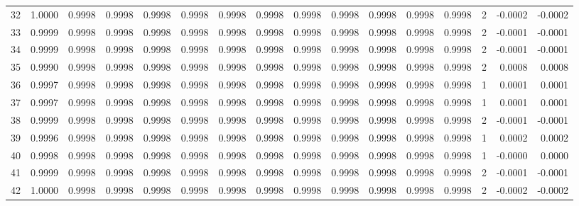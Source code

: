 \begin{tabular}{lrrrrrrrrrrrrrrr}
32  &      1.0000 &  0.9998 &  0.9998 &  0.9998 &  0.9998 &  0.9998 &  0.9998 &  0.9998 &  0.9998 &  0.9998 &   0.9998 &     0.9998 &      2 &                   -0.0002 &                    -0.0002 \\
33  &      0.9999 &  0.9998 &  0.9998 &  0.9998 &  0.9998 &  0.9998 &  0.9998 &  0.9998 &  0.9998 &  0.9998 &   0.9998 &     0.9998 &      2 &                   -0.0001 &                    -0.0001 \\
34  &      0.9999 &  0.9998 &  0.9998 &  0.9998 &  0.9998 &  0.9998 &  0.9998 &  0.9998 &  0.9998 &  0.9998 &   0.9998 &     0.9998 &      2 &                   -0.0001 &                    -0.0001 \\
35  &      0.9990 &  0.9998 &  0.9998 &  0.9998 &  0.9998 &  0.9998 &  0.9998 &  0.9998 &  0.9998 &  0.9998 &   0.9998 &     0.9998 &      2 &                    0.0008 &                     0.0008 \\
36  &      0.9997 &  0.9998 &  0.9998 &  0.9998 &  0.9998 &  0.9998 &  0.9998 &  0.9998 &  0.9998 &  0.9998 &   0.9998 &     0.9998 &      1 &                    0.0001 &                     0.0001 \\
37  &      0.9997 &  0.9998 &  0.9998 &  0.9998 &  0.9998 &  0.9998 &  0.9998 &  0.9998 &  0.9998 &  0.9998 &   0.9998 &     0.9998 &      1 &                    0.0001 &                     0.0001 \\
38  &      0.9999 &  0.9998 &  0.9998 &  0.9998 &  0.9998 &  0.9998 &  0.9998 &  0.9998 &  0.9998 &  0.9998 &   0.9998 &     0.9998 &      2 &                   -0.0001 &                    -0.0001 \\
39  &      0.9996 &  0.9998 &  0.9998 &  0.9998 &  0.9998 &  0.9998 &  0.9998 &  0.9998 &  0.9998 &  0.9998 &   0.9998 &     0.9998 &      1 &                    0.0002 &                     0.0002 \\
40  &      0.9998 &  0.9998 &  0.9998 &  0.9998 &  0.9998 &  0.9998 &  0.9998 &  0.9998 &  0.9998 &  0.9998 &   0.9998 &     0.9998 &      1 &                   -0.0000 &                     0.0000 \\
41  &      0.9999 &  0.9998 &  0.9998 &  0.9998 &  0.9998 &  0.9998 &  0.9998 &  0.9998 &  0.9998 &  0.9998 &   0.9998 &     0.9998 &      2 &                   -0.0001 &                    -0.0001 \\
42  &      1.0000 &  0.9998 &  0.9998 &  0.9998 &  0.9998 &  0.9998 &  0.9998 &  0.9998 &  0.9998 &  0.9998 &   0.9998 &     0.9998 &      2 &                   -0.0002 &                    -0.0002 \\

\end{tabular}
